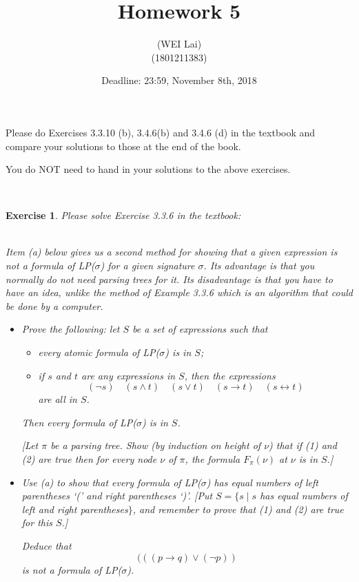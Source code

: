 \documentclass[12pt,a4paper]{article}
\title{Homework 5}
\author{(WEI Lai)\\
(1801211383)}
\date{Deadline: 23:59, November 8th, 2018}
\theoremstyle{plain}
\newtheorem{exercise}{Exercise}
\begin{document}
\maketitle

Please do Exercises 3.3.10 (b), 3.4.6(b) and 3.4.6 (d) in the textbook and compare your solutions to those at the end of the book.

You do NOT need to hand in your solutions to the above exercises.

\ \\
\begin{exercise}
Please solve Exercise 3.3.6 in the textbook:

\ \\
Item (a) below gives us a second method for showing that a given expression is not a formula of LP($\sigma$) for a given signature $\sigma$.
Its advantage is that you normally do not need parsing trees for it. 
Its disadvantage is that you have to have an idea, unlike the method of Example 3.3.6 which is an algorithm that could be done by a computer.
%
\begin{itemize}

\item[(a)] Prove the following: let $S$ be a set of expressions such that 
%
\begin{itemize}

\item[(1)] every atomic formula of LP($\sigma$) is in $S$;

\item[(2)] if $s$ and $t$ are any expressions in $S$, then the expressions
%
\[
(\neg s) \quad (s \wedge t) \quad (s \vee t) \quad (s \rightarrow t) \quad (s \leftrightarrow t)
\]
%
are all in $S$.

\end{itemize} 
%
Then every formula of LP($\sigma$) is in $S$.

[Let $\pi$ be a parsing tree. 
Show (by induction on height of $\nu$) that if (1) and (2) are true then for every node $\nu$ of $\pi$, the formula $F_\pi (\nu)$ at $\nu$ is in $S$.]

\item[(b)] Use (a) to show that every formula of LP($\sigma$) has equal numbers of left parentheses `(' and right parentheses `)'. 
[Put $S = \{s \mid s$ has equal numbers of left and right parentheses$\}$, and remember to prove that (1) and (2) are true for this $S$.] 

Deduce that
%
\[
(((p \rightarrow q) \vee (\neg p))
\]
%
is not a formula of LP($\sigma$).

\end{itemize}
\end{exercise}
\end{document}
